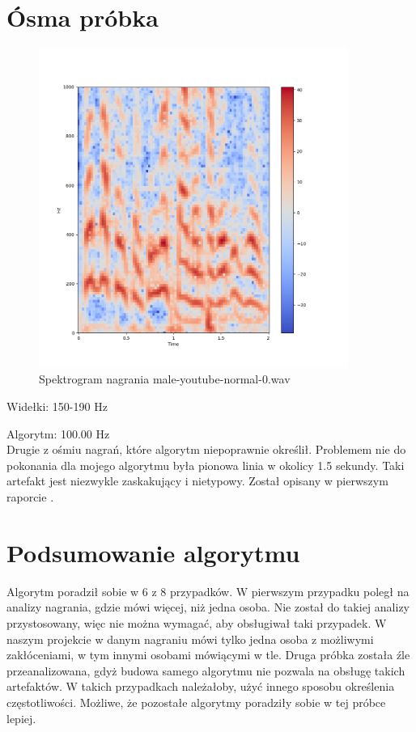 \documentclass[a4paper,12pt]{extarticle}
\begin{document}
\clearpage

\section*{Ósma próbka}

\begin{figure}[h!]
\centering
\includegraphics[width=0.9\textwidth]{male-youtube-normal-0}
\caption{Spektrogram nagrania male-youtube-normal-0.wav}
\end{figure}

\noindent Widełki: 150-190 Hz

\noindent Algorytm: 100.00 Hz\\

\noindent Drugie z ośmiu nagrań, które algorytm niepoprawnie określił. Problemem nie do pokonania dla mojego algorytmu była pionowa linia w okolicy 1.5 sekundy. Taki artefakt jest niezwykle zaskakujący i nietypowy. Został opisany w pierwszym raporcie \cite{report1}.

\clearpage

\section*{Podsumowanie algorytmu}

Algorytm poradził sobie w 6 z 8 przypadków. W pierwszym przypadku poległ na analizy nagrania, gdzie mówi więcej, niż jedna osoba. Nie został do takiej analizy przystosowany, więc nie można wymagać, aby obsługiwał taki przypadek. W naszym projekcie w danym nagraniu mówi tylko jedna osoba z możliwymi zakłóceniami, w tym innymi osobami mówiącymi w tle. Druga próbka została źle przeanalizowana, gdyż budowa samego algorytmu nie pozwala na obsługę takich artefaktów. W takich przypadkach należałoby, użyć innego sposobu określenia częstotliwości. Możliwe, że pozostałe algorytmy poradziły sobie w tej próbce lepiej.
\end{document}
